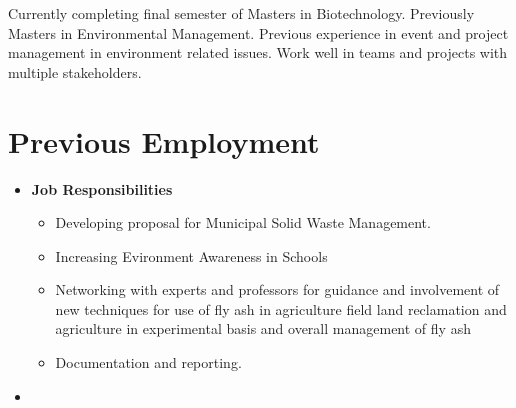 \documentclass[11pt,a4paper,sans]{moderncv}
\title{}                               %
\begin{document}
\makecvtitle

\small{Currently completing final semester of Masters in Biotechnology. Previously Masters in Environmental Management. Previous experience in event and project management in environment related issues. Work well in teams and projects with multiple stakeholders.}

\section{Previous Employment}

\vspace{6pt}

\begin{itemize}

\item{}
    \textbf{Job Responsibilities}
    \begin{itemize}
    \item{ Developing proposal for Municipal Solid Waste Management.}
    \item {Increasing Evironment Awareness in Schools}
    \item {Networking with experts and professors for guidance and involvement of new techniques for use of fly ash in agriculture field land reclamation and agriculture in experimental basis and overall management of fly ash}
    \item Documentation and reporting.

    \end{itemize}

\vspace{6pt}

\item{}

\end{itemize}
\end{document}
